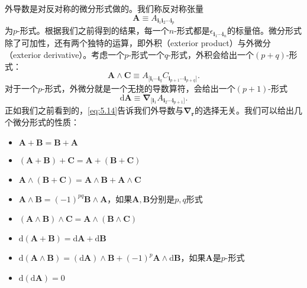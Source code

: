 外导数是对反对称的微分形式做的。我们称反对称张量
\begin{equation*}
	\boldsymbol{A} \equiv A_{\boldsymbol{i}_{1}\boldsymbol{i}_{2} \cdots \boldsymbol{i}_{p}}
\end{equation*}
为$p$-形式。根据我们之前得到的结果，每一个$n$-形式都是$\epsilon _{\boldsymbol{i}_{1} \cdots \boldsymbol{i}_{n}}$的标量倍。微分形式除了可加性，还有两个独特的运算，即外积（exterior product）与外微分（exterior derivative）。考虑一个$p$-形式一个$q$-形式，外积会给出一个$( p+q)$-形式：
\begin{equation*}
	\boldsymbol{A} \land \boldsymbol{C} \equiv A_{[\boldsymbol{i}_{i} \cdots \boldsymbol{i}_{q}} C_{\boldsymbol{i}_{p+1} \cdots \boldsymbol{i}_{p+q}]} .
\end{equation*}
对于一个$p$-形式，外微分就是一个无挠的导数算符，会给出一个$( p+1)$-形式
\begin{equation*}
	\mathrm{d}\boldsymbol{A} \equiv \boldsymbol{\nabla }_{[\boldsymbol{i}_{1}} A_{\boldsymbol{i}_{2} \cdots \boldsymbol{i}_{p+1}]} .
\end{equation*}
正如我们之前看到的，\ref{eq:5.14}告诉我们外导数与$\boldsymbol{\nabla }_{\boldsymbol{r}}$的选择无关。我们可以给出几个微分形式的性质：
\begin{itemize}
	\item $\boldsymbol{A} +\boldsymbol{B} =\boldsymbol{B} +\boldsymbol{A}$
	\item $\left(\boldsymbol{A} +\boldsymbol{B}\right) +\boldsymbol{C} =\boldsymbol{A} +\left(\boldsymbol{B} +\boldsymbol{C}\right)$
	\item $\boldsymbol{A} \land \left(\boldsymbol{B} +\boldsymbol{C}\right) =\boldsymbol{A} \land \boldsymbol{B} +\boldsymbol{A} \land \boldsymbol{C}$
	\item $\boldsymbol{A} \land \boldsymbol{B} =\left( -1\right)^{pq}\boldsymbol{B} \land \boldsymbol{A}$，如果$\boldsymbol{A},\boldsymbol{B}$分别是$p,q$形式
	\item $(\boldsymbol{A} \land \boldsymbol{B}) \land \boldsymbol{C} =\boldsymbol{A} \land (\boldsymbol{B} \land \boldsymbol{C})$
	\item $\mathrm{d}\left(\boldsymbol{A} +\boldsymbol{B}\right) =\mathrm{d}\boldsymbol{A} +\mathrm{d}\boldsymbol{B}$
	\item $\mathrm{d}\left(\boldsymbol{A} \land \boldsymbol{B}\right) =\left(\mathrm{d}\boldsymbol{A}\right) \land \boldsymbol{B} +\left( -1\right)^{p}\boldsymbol{A} \land \mathrm{d}\boldsymbol{B}$，如果$\boldsymbol{A}$是$p$-形式
	\item $\mathrm{d}\left(\mathrm{d}\boldsymbol{A}\right) =0$
\end{itemize}

